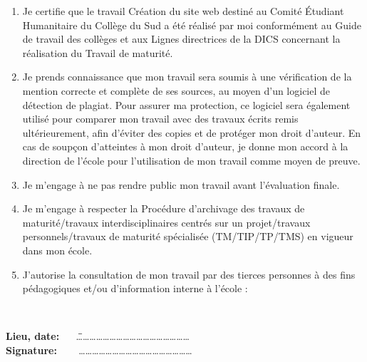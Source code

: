 \documentclass[a4,10pt,french]{sphinxmanual}
\begin{document}
\begin{normalsize}
\begin{enumerate}
%
\item {} 
\sphinxAtStartPar
Je certifie que le travail Création du site web destiné au Comité Étudiant Humanitaire du Collège du Sud a été réalisé par moi conformément au Guide de travail des collèges et aux Lignes directrices de la DICS concernant la réalisation du Travail de maturité.

\item {} 
\sphinxAtStartPar
Je prends connaissance que mon travail sera soumis à une vérification de la
mention correcte et complète de ses sources, au moyen d’un logiciel de
détection de plagiat. Pour assurer ma protection, ce logiciel sera également
utilisé pour comparer mon travail avec des travaux écrits remis
ultérieurement, afin d’éviter des copies et de protéger mon droit d’auteur.
En cas de soupçon d’atteintes à mon droit d’auteur, je donne mon accord à la
direction de l’école pour l’utilisation de mon travail comme moyen de
preuve.

\item {} 
\sphinxAtStartPar
Je m’engage à ne pas rendre public mon travail avant l’évaluation finale.

\item {} 
\sphinxAtStartPar
Je m’engage à respecter la Procédure d’archivage des travaux de
maturité/travaux interdisciplinaires centrés sur un projet/travaux
personnels/travaux de maturité spécialisée (TM/TIP/TP/TMS) en vigueur dans
mon école.

\item {} 
\sphinxAtStartPar
J’autorise la consultation de mon travail par des tierces personnes à des
fins pédagogiques et/ou d’information interne à l’école :

{
\square \quad {} \\
\square \quad {}
}

\end{enumerate}

{
\large
\begin{tabbing}
\textbf{Lieu, date:} ~~ \=  \= \ldots\ldots\ldots\ldots\ldots\ldots\ldots\ldots\ldots\ldots\ldots\ldots\ldots\ldots\ldots\ldots\ldots \\
\textbf{Signature:} ~~~ \>  \> \ldots\ldots\ldots\ldots\ldots\ldots\ldots\ldots\ldots\ldots\ldots\ldots\ldots\ldots\ldots\ldots\ldots
\end{tabbing} 
}


\end{normalsize}
\end{document}
